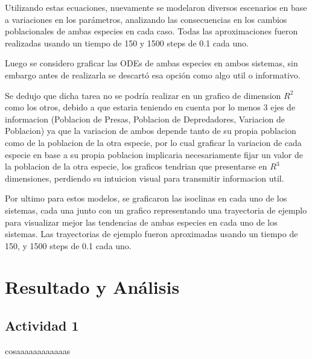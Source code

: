\documentclass{article}
\begin{document}
\noindent Utilizando estas ecuaciones, nuevamente se modelaron diversos escenarios en base a variaciones en los parámetros, analizando las consecuencias en los cambios poblacionales de ambas especies en cada caso. %
Todas las aproximaciones fueron realizadas usando un tiempo de 150 y 1500 steps de 0.1 cada uno.
\vspace{1\baselineskip}

\noindent Luego se considero graficar las ODEs de ambas especies en ambos sistemas, sin embargo antes de realizarla se descartó esa opción como algo util o informativo. \vspace{1\baselineskip}

\noindent Se dedujo que dicha tarea no se podría realizar en un grafico de dimension \( R^2 \) como los otros, debido a que estaria teniendo en cuenta por lo menos 3 ejes de informacion (Poblacion de Presas, Poblacion de Depredadores, Variacion de Poblacion) ya que la variacion de ambos depende tanto de su propia poblacion como de la poblacion de la otra especie, por lo cual graficar la variacion de cada especie en base a su propia poblacion implicaria necesariamente fijar un valor de la poblacion de la otra especie, los graficos tendrian que presentarse en \( R^3 \) dimensiones, perdiendo su intuicion visual para transmitir informacion util. \vspace{1\baselineskip}

\noindent Por ultimo para estos modelos, se graficaron las isoclinas en cada uno de los sistemas, cada una junto con un grafico representando una trayectoria de ejemplo para visualizar mejor las tendencias de ambas especies en cada uno de los sistemas. Las trayectorias de ejemplo fueron aproximadas usando un tiempo de 150, y 1500 steps de 0.1 cada uno.





\section*{Resultado y Análisis}



\subsection*{Actividad 1}
\noindent cosaaaaaaaaaaaas

\end{document}
